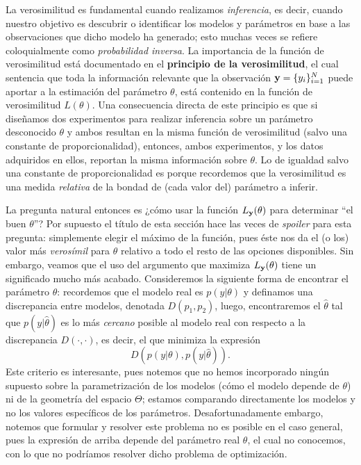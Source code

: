 La verosimilitud es fundamental cuando realizamos \emph{inferencia}, es decir, cuando nuestro objetivo es descubrir o identificar los modelos y parámetros en base a las observaciones que dicho modelo ha generado; esto muchas veces se refiere coloquialmente como \emph{probabilidad inversa}. La importancia de la función de verosimilitud está documentado en el \textbf{principio de la verosimilitud}, el cual sentencia que toda la información relevante que la observación $\mathbf{y} = \{y_i\}_{i=1}^N$ puede aportar a la estimación del parámetro $\theta$, está contenido en la función  de verosimilitud $L(\theta)$. Una consecuencia directa de este principio es que si diseñamos dos experimentos para realizar  inferencia  sobre un parámetro desconocido $\theta$ y ambos  resultan en la misma función de verosimilitud  (salvo una constante de proporcionalidad), entonces,  ambos experimentos, y los datos adquiridos en  ellos, reportan la misma  información  sobre $\theta$. Lo de igualdad salvo una constante de proporcionalidad es porque recordemos que la verosimilitud es una medida \emph{relativa} de la bondad de (cada valor del) parámetro a inferir. 

La pregunta  natural entonces es ¿cómo usar la función $L_{\mathbf{y}}(\theta)$ para determinar ``el buen $\theta$''? Por supuesto el título de esta sección hace las veces de \emph{spoiler} para esta pregunta: simplemente elegir el máximo de la función, pues éste nos da el (o los) valor más \emph{verosímil} para $\theta$ relativo a todo el resto de las opciones disponibles. Sin embargo, veamos que el uso del argumento que maximiza $L_{\mathbf{y}}(\theta)$ tiene un significado  mucho más  acabado. Consideremos la siguiente forma de encontrar el parámetro $\theta$: recordemos que el  modelo real es $p(y|\theta)$ y definamos una discrepancia entre modelos, denotada $D(p_1,p_2)$, luego, encontraremos el $\hat\theta$ tal que $p(y|\hat\theta)$ es lo más \emph{cercano} posible al modelo real con respecto a la discrepancia $D(\cdot,\cdot)$, es decir, el que minimiza la expresión
\begin{equation}
    	D(p(y|\theta),p(y|\hat\theta)).
\end{equation}  
Este criterio es interesante, pues notemos que no hemos incorporado ningún supuesto sobre la parametrización de  los  modelos (cómo el  modelo depende de $\theta$) ni de la  geometría del espacio  $\Theta$; estamos comparando directamente los modelos y no los  valores específicos de los parámetros. Desafortunadamente embargo, notemos que formular y resolver  este problema no es posible en el caso general, pues la expresión de arriba depende del parámetro real $\theta$, el cual no conocemos, con lo que no podríamos resolver dicho problema de optimización. 


